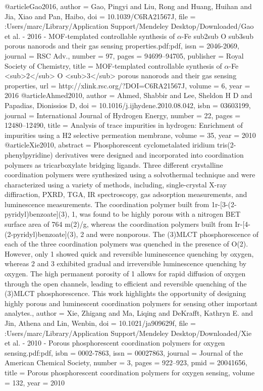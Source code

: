 @article{Gao2016,
author = {Gao, Pingyi and Liu, Rong and Huang, Huihan and Jia, Xiao and Pan, Haibo},
doi = {10.1039/C6RA21567J},
file = {:Users/marc/Library/Application Support/Mendeley Desktop/Downloaded/Gao et al. - 2016 - MOF-templated controllable synthesis of $\alpha$-Fe sub2sub O sub3sub porous nanorods and their gas sensing properties.pdf:pdf},
issn = {2046-2069},
journal = {RSC Adv.},
number = {97},
pages = {94699--94705},
publisher = {Royal Society of Chemistry},
title = {{MOF-templated controllable synthesis of $\alpha$-Fe {\textless}sub{\textgreater}2{\textless}/sub{\textgreater} O {\textless}sub{\textgreater}3{\textless}/sub{\textgreater} porous nanorods and their gas sensing properties}},
url = {http://xlink.rsc.org/?DOI=C6RA21567J},
volume = {6},
year = {2016}
}
@article{Ahmed2010,
author = {Ahmed, Shabbir and Lee, Sheldon H D and Papadias, Dionissios D},
doi = {10.1016/j.ijhydene.2010.08.042},
isbn = {03603199},
journal = {International Journal of Hydrogen Energy},
number = {22},
pages = {12480--12490},
title = {{Analysis of trace impurities in hydrogen: Enrichment of impurities using a H2 selective permeation membrane}},
volume = {35},
year = {2010}
}
@article{Xie2010,
abstract = {Phosphorescent cyclometalated iridium tris(2-phenylpyridine) derivatives were designed and incorporated into coordination polymers as tricarboxylate bridging ligands. Three different crystalline coordination polymers were synthesized using a solvothermal technique and were characterized using a variety of methods, including, single-crystal X-ray diffiraction, PXRD, TGA, IR spectroscopy, gas adsorption measurements, and luminescence measurements. The coordination polymer built from 1r-[3-(2-pyridyl)benzoate](3), 1, was found to be highly porous with a nitrogen BET surface area of 764 m(2)/g, whereas the coordination polymers built from Ir-[4-(2-pyridyl)benzoate](3), 2 and were nonporous. The (3)MLCT phosphorescence of each of the three coordination polymers was quenched in the presence of O(2). However, only 1 showed quick and reversible luminescence quenching by oxygen, whereas 2 and 3 exhibited gradual and irreversible luminescence quenching by oxygen. The high permanent porosity of 1 allows for rapid diffusion of oxygen through the open channels, leading to efficient and reversible quenching of the (3)MLCT phosphorescence. This work highlights the opportunity of designing highly porous and luminescent coordination polymers for sensing other important analytes.},
author = {Xie, Zhigang and Ma, Liqing and DeKrafft, Kathryn E. and Jin, Athena and Lin, Wenbin},
doi = {10.1021/ja909629f},
file = {:Users/marc/Library/Application Support/Mendeley Desktop/Downloaded/Xie et al. - 2010 - Porous phosphorescent coordination polymers for oxygen sensing.pdf:pdf},
isbn = {0002-7863},
issn = {00027863},
journal = {Journal of the American Chemical Society},
number = {3},
pages = {922--923},
pmid = {20041656},
title = {{Porous phosphorescent coordination polymers for oxygen sensing}},
volume = {132},
year = {2010}
}
